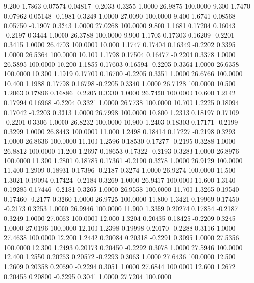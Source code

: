    9.200   1.7863   0.07574   0.04817  -0.2033   0.3255   1.0000  26.9875 100.0000
   9.300   1.7470   0.07962   0.05148  -0.1981   0.3249   1.0000  27.0090 100.0000
   9.400   1.6741   0.08568   0.05750  -0.1907   0.3243   1.0000  27.0268 100.0000
   9.800   1.1681   0.17204   0.16043  -0.2197   0.3444   1.0000  26.3788 100.0000
   9.900   1.1705   0.17303   0.16209  -0.2201   0.3415   1.0000  26.4703 100.0000
  10.000   1.1747   0.17404   0.16349  -0.2202   0.3395   1.0000  26.5364 100.0000
  10.100   1.1798   0.17504   0.16477  -0.2204   0.3378   1.0000  26.5895 100.0000
  10.200   1.1855   0.17603   0.16594  -0.2205   0.3364   1.0000  26.6358 100.0000
  10.300   1.1919   0.17700   0.16700  -0.2205   0.3351   1.0000  26.6766 100.0000
  10.400   1.1988   0.17798   0.16798  -0.2205   0.3340   1.0000  26.7128 100.0000
  10.500   1.2063   0.17896   0.16886  -0.2205   0.3330   1.0000  26.7450 100.0000
  10.600   1.2142   0.17994   0.16968  -0.2204   0.3321   1.0000  26.7738 100.0000
  10.700   1.2225   0.18094   0.17042  -0.2203   0.3313   1.0000  26.7998 100.0000
  10.800   1.2313   0.18197   0.17109  -0.2201   0.3306   1.0000  26.8232 100.0000
  10.900   1.2403   0.18303   0.17171  -0.2199   0.3299   1.0000  26.8443 100.0000
  11.000   1.2498   0.18414   0.17227  -0.2198   0.3293   1.0000  26.8636 100.0000
  11.100   1.2596   0.18530   0.17277  -0.2195   0.3288   1.0000  26.8812 100.0000
  11.200   1.2697   0.18653   0.17322  -0.2193   0.3283   1.0000  26.8976 100.0000
  11.300   1.2801   0.18786   0.17361  -0.2190   0.3278   1.0000  26.9129 100.0000
  11.400   1.2909   0.18931   0.17396  -0.2187   0.3274   1.0000  26.9274 100.0000
  11.500   1.3021   0.19094   0.17424  -0.2184   0.3269   1.0000  26.9417 100.0000
  11.600   1.3140   0.19285   0.17446  -0.2181   0.3265   1.0000  26.9558 100.0000
  11.700   1.3265   0.19540   0.17460  -0.2177   0.3260   1.0000  26.9725 100.0000
  11.800   1.3421   0.19969   0.17450  -0.2173   0.3253   1.0000  26.9946 100.0000
  11.900   1.3359   0.20274   0.17854  -0.2187   0.3249   1.0000  27.0063 100.0000
  12.000   1.3204   0.20435   0.18425  -0.2209   0.3245   1.0000  27.0196 100.0000
  12.100   1.2398   0.19998   0.20170  -0.2288   0.3116   1.0000  27.4638 100.0000
  12.200   1.2442   0.20084   0.20318  -0.2291   0.3095   1.0000  27.5356 100.0000
  12.300   1.2493   0.20173   0.20450  -0.2292   0.3078   1.0000  27.5946 100.0000
  12.400   1.2550   0.20263   0.20572  -0.2293   0.3063   1.0000  27.6436 100.0000
  12.500   1.2609   0.20358   0.20690  -0.2294   0.3051   1.0000  27.6844 100.0000
  12.600   1.2672   0.20455   0.20800  -0.2295   0.3041   1.0000  27.7204 100.0000
